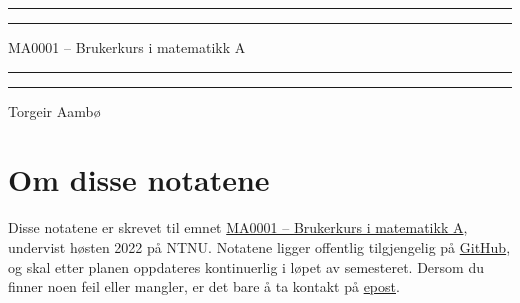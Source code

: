 \begin{titlepage}

    \vspace*{\fill}
    \rule[-11pt]{\textwidth}{1pt}
    \rule{\textwidth}{0.5pt}
    
    \begin{center}
    \Large MA0001 -- Brukerkurs i matematikk A
    \end{center}
    
    \rule{\textwidth}{0.5pt}
    \rule[10.1pt]{\textwidth}{1pt}
    
    
    \begin{center}
    Torgeir Aambø
    \end{center}
    
    \vspace{\fill}
    


\section*{Om disse notatene}

Disse notatene er skrevet til emnet \href{https://www.ntnu.no/studier/emner/MA0001}{MA0001 -- Brukerkurs i matematikk A}, undervist høsten 2022 på NTNU. 
Notatene ligger offentlig tilgjengelig på \href{https://github.com/torgeiraamboe/MA0001_H22}{GitHub}, og skal etter planen oppdateres kontinuerlig i løpet av semesteret. 
Dersom du finner noen feil eller mangler, er det bare å ta kontakt på \href{mailto:torgeir.aambo@ntnu.no}{epost}. 


\listoftodos
    
\vspace{\fill}

\end{titlepage}